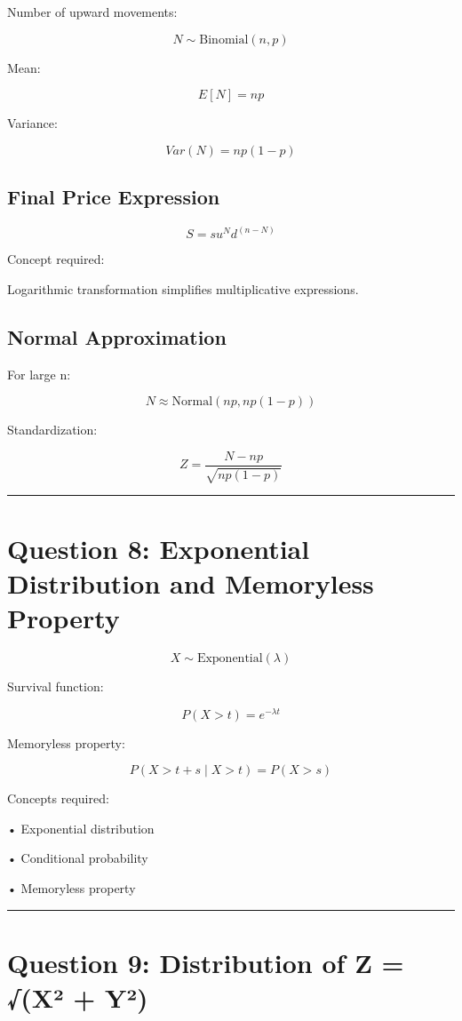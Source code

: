 \documentclass[12pt]{article}
\begin{document}
Number of upward movements:

\[
N \sim \text{Binomial}(n, p)
\]

Mean:

\[
E[N] = np
\]

Variance:

\[
Var(N) = np(1 − p)
\]

\subsection*{Final Price Expression}

\[
S = s u^N d^{(n − N)}
\]

Concept required:

Logarithmic transformation simplifies multiplicative expressions.

\subsection*{Normal Approximation}

For large n:

\[
N \approx \text{Normal}(np, np(1 − p))
\]

Standardization:

\[
Z
=
\frac{N − np}{\sqrt{np(1 − p)}}
\]

\vspace{0.5cm}
\hrule
\vspace{0.5cm}

\section*{Question 8: Exponential Distribution and Memoryless Property}

\[
X \sim \text{Exponential}(\lambda)
\]

Survival function:

\[
P(X > t) = e^{−\lambda t}
\]

Memoryless property:

\[
P(X > t + s \mid X > t)
=
P(X > s)
\]

Concepts required:

• Exponential distribution

• Conditional probability

• Memoryless property

\vspace{0.5cm}
\hrule
\vspace{0.5cm}

\section*{Question 9: Distribution of Z = √(X² + Y²)}
\end{document}
